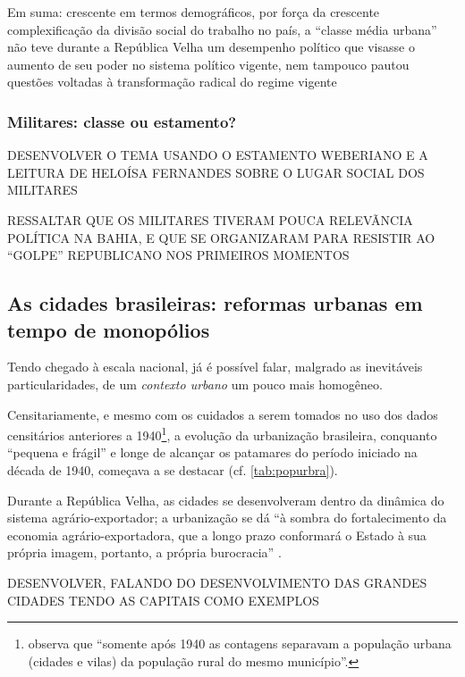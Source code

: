Em suma: crescente em termos demográficos, por força da crescente complexificação da divisão social do trabalho no país, a ``classe média urbana'' não teve durante a República Velha um desempenho político que visasse o aumento de seu poder no sistema político vigente, nem tampouco pautou questões voltadas à transformação radical do regime vigente \cite[p.~36]{pinheiro_clamed_1977}

\subsubsection{Militares: classe ou estamento?}\label{subsubsec:milclaest}

DESENVOLVER O TEMA USANDO O ESTAMENTO WEBERIANO E A LEITURA DE HELOÍSA FERNANDES SOBRE O LUGAR SOCIAL DOS MILITARES

RESSALTAR QUE OS MILITARES TIVERAM POUCA RELEVÃNCIA POLÍTICA NA BAHIA, E QUE SE ORGANIZARAM PARA RESISTIR AO ``GOLPE'' REPUBLICANO NOS PRIMEIROS MOMENTOS

\subsection{As cidades brasileiras: reformas urbanas em tempo de monopólios}\label{subsec:cidbraref}

Tendo chegado à escala nacional, já é possível falar, malgrado as inevitáveis particularidades, de um \textit{contexto urbano} um pouco mais homogêneo.

Censitariamente, e mesmo com os cuidados a serem tomados no uso dos dados censitários anteriores a 1940\footnote{ observa que ``somente após 1940 as contagens separavam a população urbana (cidades e vilas) da população rural do mesmo município''.}, a evolução da urbanização brasileira, conquanto ``pequena e frágil'' \cite[p.~303]{suzigan_polgov_2001} e longe de alcançar os patamares do período iniciado na década de 1940, começava a se destacar (cf. \autoref{tab:popurbra}).



Durante a República Velha, as cidades se desenvolveram dentro da dinâmica do sistema agrário-exportador; a urbanização se dá ``à sombra do fortalecimento da economia agrário-exportadora, que a longo prazo conformará o Estado à sua própria imagem, portanto, a própria burocracia''  \cite[p.~22-23]{pinheiro_clamed_1977}.

DESENVOLVER, FALANDO DO DESENVOLVIMENTO DAS GRANDES CIDADES TENDO AS CAPITAIS COMO EXEMPLOS

